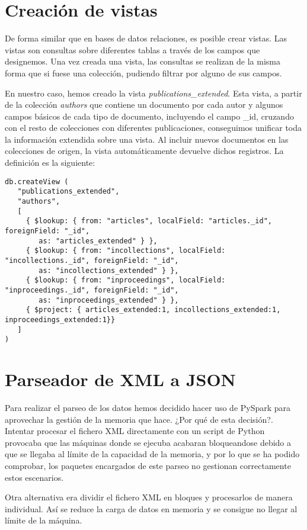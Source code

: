 \section{Creación de vistas}\label{sec:parser}

De forma similar que en bases de datos relaciones, es posible crear vistas. Las vistas son consultas sobre diferentes tablas a través de los campos que designemos. Una vez creada una vista, las consultas se realizan de la misma forma que si fuese una colección, pudiendo filtrar por alguno de sus campos.

En nuestro caso, hemos creado la vista \textit{publications\_extended}. Esta vista, a partir de la colección \textit{authors} que contiene un documento por cada autor y algunos campos básicos de cada tipo de documento, incluyendo el campo \_id, cruzando con el resto de colecciones con diferentes publicaciones, conseguimos unificar toda la información extendida sobre una vista. Al incluir nuevos documentos en las colecciones de origen, la vista automáticamente devuelve dichos registros. La definición es la siguiente:

\begin{verbatim}
db.createView (
   "publications_extended",
   "authors",
   [
     { $lookup: { from: "articles", localField: "articles._id", foreignField: "_id",
        as: "articles_extended" } },
     { $lookup: { from: "incollections", localField: "incollections._id", foreignField: "_id",
        as: "incollections_extended" } },
     { $lookup: { from: "inproceedings", localField: "inproceedings._id", foreignField: "_id",
        as: "inproceedings_extended" } },
     { $project: { articles_extended:1, incollections_extended:1, inproceedings_extended:1}}
   ]
)
\end{verbatim}


\section{Parseador de XML a JSON}\label{sec:parser}

Para realizar el parseo de los datos hemos decidido hacer uso de PySpark para aprovechar la gestión de la memoria que hace. ¿Por qué de esta decisión?. Intentar procesar el fichero \gls{XML} directamente con un script de Python provocaba que las máquinas donde se ejecuba acabaran bloqueandose debido a que se llegaba al límite de la capacidad de la memoria, y por lo que se ha podido comprobar, los paquetes encargados de este parseo no gestionan correctamente estos escenarios.

Otra alternativa era dividir el fichero XML en bloques y procesarlos de manera individual. Así se reduce la carga de datos en memoria y se consigue no llegar al límite de la máquina. 
